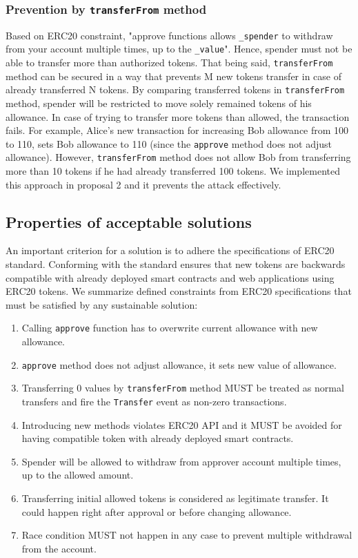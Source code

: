 \subsubsection*{Prevention by \texttt{transferFrom} method} Based on ERC20 constraint, "approve functions allows \texttt{\_spender} to withdraw from your account multiple times, up to the \texttt{\_value}". Hence, spender must not be able to transfer more than authorized tokens. That being said, \texttt{transferFrom} method can be secured in a way that prevents M new tokens transfer in case of already transferred N tokens. By comparing transferred tokens in \texttt{transferFrom} method, spender will be restricted to move solely remained tokens of his allowance. In case of trying to transfer more tokens than allowed, the transaction fails. For example, Alice's new transaction for increasing Bob allowance from 100 to 110, sets Bob allowance to 110 (since the \texttt{approve} method does not adjust allowance). However, \texttt{transferFrom} method does not allow Bob from transferring more than 10 tokens if he had already transferred 100 tokens. We implemented this approach in proposal 2 and it prevents the attack effectively.

\subsection{Properties of acceptable solutions}
An important criterion for a solution is to adhere the specifications of ERC20 standard. Conforming with the standard ensures that new tokens are backwards compatible with already deployed smart contracts and web applications using ERC20 tokens. We summarize defined constraints from ERC20 specifications \cite{Ref08} that must be satisfied by any sustainable solution:

\begin{enumerate}
	\item Calling \texttt{approve} function has to overwrite current allowance with new allowance.
	\item \texttt{approve} method does not adjust allowance, it sets new value of allowance.
	\item Transferring 0 values by \texttt{transferFrom} method MUST be treated as normal transfers and fire the \texttt{Transfer} event as non-zero transactions.
	\item Introducing new methods violates ERC20 API and it MUST be avoided for having compatible token with already deployed smart contracts.
	\item Spender will be allowed to withdraw from approver account multiple times, up to the allowed amount.
	\item Transferring initial allowed tokens is considered as legitimate transfer. It could happen right after approval or before changing allowance.
	\item Race condition MUST not happen in any case to prevent multiple withdrawal from the account.
\end{enumerate}